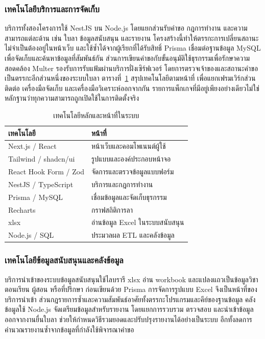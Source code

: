 \subsubsection{เทคโนโลยีบริการและการจัดเก็บ}
บริการทั้งสองโครงการใช้ NestJS บน Node.js โดยแยกส่วนรับคำขอ กฎการทำงาน และความสามารถแต่ละด้าน เช่น ใบลา ข้อมูลสนับสนุน และรายงาน โครงสร้างนี้ทำให้ตรรกะการเปลี่ยนสถานะไม่จำเป็นต้องอยู่ในหน้าเว็บ และใช้ซ้ำได้จากผู้เรียกที่ได้รับสิทธิ์
Prisma เชื่อมต่อฐานข้อมูล MySQL เพื่อจัดเก็บและค้นหาข้อมูลที่สัมพันธ์กัน ส่วนการเขียนคำขอกับขั้นอนุมัติใช้ธุรกรรมเพื่อรักษาความสอดคล้อง Multer รองรับการรับแฟ้มผ่านบริการฝั่งเซิร์ฟเวอร์ โดยการตรวจเจ้าของและสถานะคำขอเป็นตรรกะอีกส่วนหนึ่งของระบบใบลา
ตารางที่~\ref{tab:tech-stack} สรุปเทคโนโลยีตามหน้าที่ เพื่อแยกเฟรมเวิร์กส่วนติดต่อ เครื่องมือจัดเก็บ และเครื่องมือวิเคราะห์ออกจากกัน รายการแพ็กเกจที่มีอยู่เพียงอย่างเดียวไม่ใช่หลักฐานว่าทุกความสามารถถูกเปิดใช้ในการติดตั้งจริง
\begin{table}[H]
\caption{เทคโนโลยีหลักและหน้าที่ในระบบ}\label{tab:tech-stack}
\centering
\begin{tabularx}{\columnwidth}{|p{30mm}|X|}
\hline
เทคโนโลยี & หน้าที่ \\ \hline
Next.js / React & หน้าเว็บและคอมโพเนนต์ผู้ใช้ \\ \hline
Tailwind / shadcn/ui & รูปแบบและองค์ประกอบหน้าจอ \\ \hline
React Hook Form / Zod & จัดการและตรวจข้อมูลแบบฟอร์ม \\ \hline
NestJS / TypeScript & บริการและกฎการทำงาน \\ \hline
Prisma / MySQL & เชื่อมข้อมูลและจัดเก็บธุรกรรม \\ \hline
Recharts & กราฟสถิติการลา \\ \hline
xlsx & อ่านข้อมูล Excel ในระบบสนับสนุน \\ \hline
Node.js / SQL & ประมวลผล ETL และคลังข้อมูล \\ \hline
\end{tabularx}
\end{table}
\subsubsection{เทคโนโลยีข้อมูลสนับสนุนและคลังข้อมูล}
บริการนำเข้าของระบบข้อมูลสนับสนุนใช้ไลบรารี xlsx อ่าน workbook และแปลงแถวเป็นข้อมูลวิชา ตอนเรียน ผู้สอน หรือที่ปรึกษา ก่อนเขียนด้วย Prisma การจัดการรูปแบบ Excel จึงเป็นหน้าที่ของบริการนำเข้า ส่วนกฎรายการซ้ำและความสัมพันธ์อาศัยทั้งตรรกะโปรแกรมและคีย์ของฐานข้อมูล
คลังข้อมูลใช้ Node.js จัดเตรียมข้อมูลสำหรับรายงาน โดยแยกการรวบรวม ตรวจสอบ และนำเข้าข้อมูลออกจากงานยื่นใบลา ช่วยให้กำหนดวิธีรวมยอดและปรับปรุงรายงานได้อย่างเป็นระบบ อีกทั้งลดการคำนวณรายงานซ้ำจากข้อมูลที่กำลังใช้พิจารณาคำขอ
